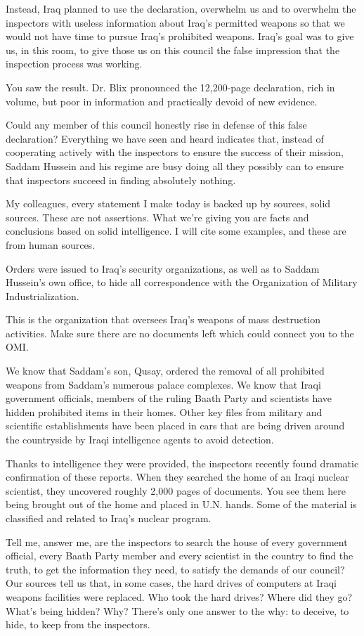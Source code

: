\documentclass[10pt,a4paper]{article}
\begin{document}
Instead, Iraq planned to use the declaration, overwhelm us and to overwhelm the inspectors with useless information about Iraq's permitted weapons so that we would not have time to pursue Iraq's prohibited weapons. Iraq's goal was to give us, in this room, to give those us on this council the false impression that the inspection process was working.

You saw the result. Dr. Blix pronounced the 12,200-page declaration, rich in volume, but poor in information and practically devoid of new evidence.

Could any member of this council honestly rise in defense of this false declaration? Everything we have seen and heard indicates that, instead of cooperating actively with the inspectors to ensure the success of their mission, Saddam Hussein and his regime are busy doing all they possibly can to ensure that inspectors succeed in finding absolutely nothing.

My colleagues, every statement I make today is backed up by sources, solid sources. These are not assertions. What we're giving you are facts and conclusions based on solid intelligence. I will cite some examples, and these are from human sources.

Orders were issued to Iraq's security organizations, as well as to Saddam Hussein's own office, to hide all correspondence with the Organization of Military Industrialization.

This is the organization that oversees Iraq's weapons of mass destruction activities. Make sure there are no documents left which could connect you to the OMI.

We know that Saddam's son, Qusay, ordered the removal of all prohibited weapons from Saddam's numerous palace complexes. We know that Iraqi government officials, members of the ruling Baath Party and scientists have hidden prohibited items in their homes. Other key files from military and scientific establishments have been placed in cars that are being driven around the countryside by Iraqi intelligence agents to avoid detection.

Thanks to intelligence they were provided, the inspectors recently found dramatic confirmation of these reports. When they searched the home of an Iraqi nuclear scientist, they uncovered roughly 2,000 pages of documents. You see them here being brought out of the home and placed in U.N. hands. Some of the material is classified and related to Iraq's nuclear program.

Tell me, answer me, are the inspectors to search the house of every government official, every Baath Party member and every scientist in the country to find the truth, to get the information they need, to satisfy the demands of our council? Our sources tell us that, in some cases, the hard drives of computers at Iraqi weapons facilities were replaced. Who took the hard drives? Where did they go? What's being hidden? Why? There's only one answer to the why: to deceive, to hide, to keep from the inspectors.
\end{document}
